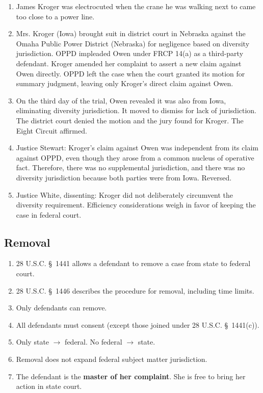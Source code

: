 \begin{enumerate}
    \item James Kroger was electrocuted when the crane he was walking next to 
    came too close to a power line.
    \item Mrs. Kroger (Iowa) brought suit in district court in Nebraska 
    against the Omaha Public Power District (Nebraska) for negligence based on 
    diversity jurisdiction. OPPD impleaded Owen under FRCP 14(a) as a 
    third-party defendant. Kroger amended her complaint to assert a new claim 
    against Owen directly. OPPD left the case when the court granted its 
    motion for summary judgment, leaving only Kroger's direct claim against 
    Owen.
    \item On the third day of the trial, Owen revealed it was also from Iowa, 
    eliminating diversity jurisdiction. It moved to dismiss for lack of 
    jurisdiction. The district court denied the motion and the jury found for 
    Kroger. The Eight Circuit affirmed.
    \item Justice Stewart: Kroger's claim against Owen was independent from 
    its claim against OPPD, even though they arose from a common nucleus of 
    operative fact. Therefore, there was no supplemental jurisdiction, and 
    there was no diversity jurisdiction because both parties were from Iowa.  
    Reversed.
    \item Justice White, dissenting: Kroger did not deliberately circumvent 
    the diversity requirement. Efficiency considerations weigh in favor of 
    keeping the case in federal court.
\end{enumerate}

\subsection{Removal}

\begin{enumerate}
    \item 28 U.S.C. \S\ 1441 allows a defendant to remove a case from state to 
    federal court.
    \item 28 U.S.C. \S\ 1446 describes the procedure for removal, including 
    time limits.
    \item Only defendants can remove.
    \item All defendants must consent (except those joined under 28 U.S.C. \S\ 
    1441(c)).
    \item Only state $\rightarrow$ federal. No federal $\rightarrow$ state.
    \item Removal does not expand federal subject matter jurisdiction.
    \item The defendant is the \textbf{master of her complaint}. She is free 
    to bring her action in state court.
\end{enumerate}

